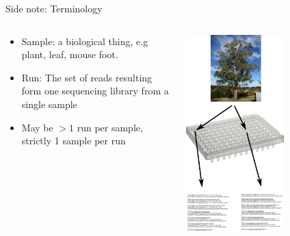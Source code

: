 \documentclass[t]{beamer}
\begin{document}
\begin{frame}{Side note: Terminology}
  \begin{columns}
    \begin{column}{0.6\textwidth}
      \begin{itemize}
        \item Sample: a biological thing, e.g plant, leaf, mouse foot.
        \item Run: The set of reads resulting form one sequencing library from
          a single sample
        \item May be $>1$ run per sample, strictly 1 sample per run
      \end{itemize}
    \end{column}
    \begin{column}{0.4\textwidth}
      \begin{center}
        \includegraphics[width=0.6\textwidth]{img/sample-run.png}
      \end{center}
    \end{column}
  \end{columns}
\end{frame}
\end{document}
